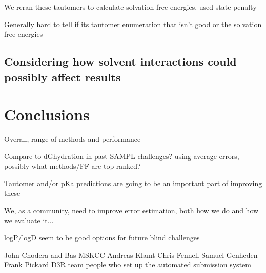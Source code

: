 We reran these tautomers to calculate solvation free energies, used state penalty %

Generally hard to tell if its tautomer enumeration that isn't good or the solvation free energies


\subsection{Considering how solvent interactions could possibly affect results} 
\label{results:7}


\section{Conclusions}
\label{conclusions}

Overall, range of methods and performance

Compare to dGhydration in past SAMPL challenges? using average errors, possibly what methods/FF are top ranked?

Tautomer and/or pKa predictions are going to be an important part of improving these

We, as a community, need to improve error estimation, both how we do and how we evaluate it...

logP/logD seem to be good options for future blind challenges

\begin{acknowledgements} %
John Chodera and Bas MSKCC
Andreas Klamt
Chris Fennell
Samuel Genheden
Frank Pickard
D3R team
people who set up the automated submission system %

\end{acknowledgements}


